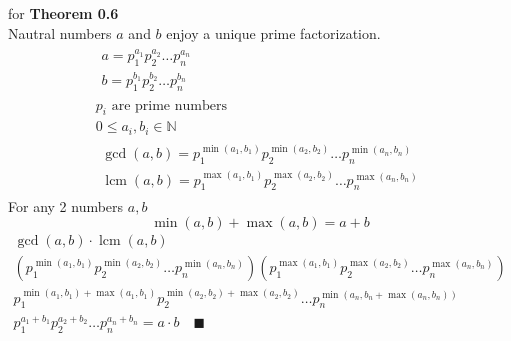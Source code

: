 \documentclass[letterpaper, 12pt]{article}
\newenvironment{proof}[1][Proof]{\begin{trivlist}
\item[\hskip \labelsep {\bfseries #1}]}{\end{trivlist}}
\newcommand{\qed}{\quad \blacksquare}
\DeclareMathOperator{\lcm}{lcm}
\newcommand{\N}{\mathbb{N}}
\newcommand{\0}{\emptyset}
\begin{document}
    \begin{proof}
        for \textbf{Theorem 0.6} \\
        Nautral numbers $a$ and $b$ enjoy a unique prime factorization.
        \begin{gather*}
            \begin{aligned}
                a = p_1^{a_1} p_2^{a_2} \dots p_n^{a_n} \\
                b = p_1^{b_1} p_2^{b_2} \dots p_n^{b_n}
            \end{aligned} \\
            p_i \text{ are prime numbers} \\
            0 \le a_i, b_i \in \N \\
            \begin{aligned}
                \gcd(a, b) = p_1^{\min(a_1, b_1)} p_2^{\min(a_2, b_2)} \dots p_n^{\min(a_n, b_n)} \\
                \lcm(a, b) = p_1^{\max(a_1, b_1)} p_2^{\max(a_2, b_2)} \dots p_n^{\max(a_n, b_n)}
            \end{aligned}
        \end{gather*}
        For any 2 numbers $a, b$
        \[\min(a, b) + \max(a, b) = a + b\]
        \begin{gather*}
            \gcd(a, b) \cdot \lcm(a, b) \\
            \left(p_1^{\min(a_1, b_1)} p_2^{\min(a_2, b_2)} \dots p_n^{\min(a_n, b_n)}\right)
            \left(p_1^{\max(a_1, b_1)} p_2^{\max(a_2, b_2)} \dots p_n^{\max(a_n, b_n)}\right) \\
            p_1^{\min(a_1, b_1) + \max(a_1, b_1)} p_2^{\min(a_2, b_2) + \max(a_2, b_2)} 
                \dots p_n^{\min(a_n, b_n + \max(a_n, b_n))} \\
            p_1^{a_1 + b_1} p_2^{a_2 + b_2} \dots p_n^{a_n + b_n} = a \cdot b \qed
        \end{gather*}
    \end{proof}
\end{document}
